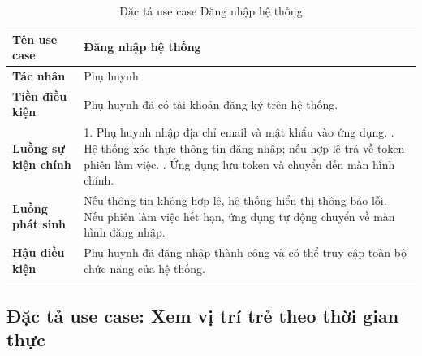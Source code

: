 \documentclass[../DoAn.tex]{subfiles}
\begin{document}
\begin{table}[H]
\centering
\caption{Đặc tả use case Đăng nhập hệ thống}
\label{table:uc_login}
\begin{tabular}{|l|p{9.5cm}|}
\hline
\textbf{Tên use case}       & Đăng nhập hệ thống \\
\hline
\textbf{Tác nhân}           & Phụ huynh \\
\hline
\textbf{Tiền điều kiện}     & Phụ huynh đã có tài khoản đăng ký trên hệ thống. \\
\hline
\textbf{Luồng sự kiện chính} &
1. Phụ huynh nhập địa chỉ email và mật khẩu vào ứng dụng. \newline
2. Hệ thống xác thực thông tin đăng nhập; nếu hợp lệ trả về token phiên làm việc. \newline
3. Ứng dụng lưu token và chuyển đến màn hình chính. \\
\hline
\textbf{Luồng phát sinh}    & Nếu thông tin không hợp lệ, hệ thống hiển thị thông báo lỗi. Nếu phiên làm việc hết hạn, ứng dụng tự động chuyển về màn hình đăng nhập. \\
\hline
\textbf{Hậu điều kiện}      & Phụ huynh đã đăng nhập thành công và có thể truy cập toàn bộ chức năng của hệ thống. \\
\hline
\end{tabular}
\end{table}

\subsection{Đặc tả use case: Xem vị trí trẻ theo thời gian thực}
\end{document}

